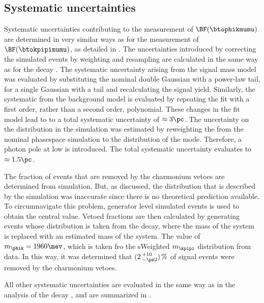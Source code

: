 

\subsection{Systematic uncertainties}
\label{ssec:phik:syst}

Systematic uncertainties contributing to the measurement of $\BF(\btophikmumu)$ are determined in
very similar ways as for the measurement of $\BF(\btokpipimumu)$, as detailed in
.
The uncertainties introduced by correcting the simulated events by weighting and resampling are
calculated in the same way as for the decay \btokpipimumu.
The systematic uncertainty arising from the signal mass model was evaluated by
substituting the nominal double Gaussian with a power-law tail, for a single Gaussian with a tail
and recalculating the signal yield.
Similarly, the systematic from the background model is evaluated by repeating the fit with a first
order, rather than a second order, polynomial.
These changes in the fit model lead to to a total systematic uncertainty of $\approx3\pc$.
The uncertainty on the \qsq distribution in the simulation was estimated by reweighting the from
the nominal phasespace simulation to the distribution of the  mode.
Therefore, a photon pole at low \qsq is introduced.
The total systematic uncertainty evaluates to $\approx1.5\pc$.

The fraction of events that are removed by the charmonium vetoes are determined from simulation.
But, as discussed, the \qsq distribution that is described by the \btophikmumu simulation was
inaccurate since there is no theoretical prediction available.
To circumnavigate this problem, generator level simulated events is used to obtain the central
value.
Vetoed fractions are then calculated by generating events whose \qsq distribution is taken from the
 decay, where the mass of the  system is replaced with an
estimated mass of the \phik system.
The value of $m_{\phik}=1960\mev$, which is taken fro the sWeighted $m_{\kpipi}$ distribution from
data.
In this way, it was determined that $(2\,^{+10}_{-\pz2})\,\%$ of signal events were removed by the
charmonium vetoes.

All other systematic uncertainties are evaluated in the same way as in the analysis of the decay
\btokpipimumu, and are summarized in .


